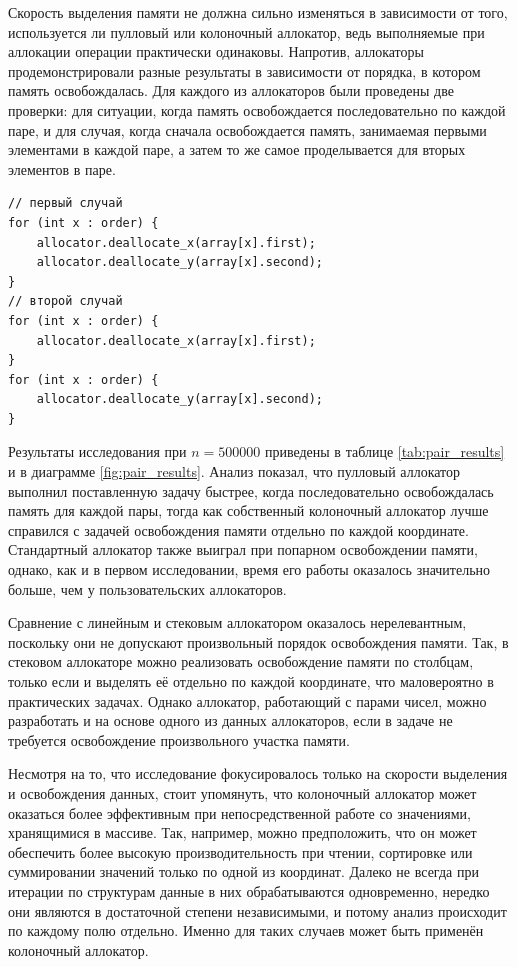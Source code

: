 Скорость выделения памяти не должна сильно изменяться в зависимости от того, используется ли пулловый или колоночный аллокатор, ведь выполняемые при аллокации операции практически одинаковы. Напротив, аллокаторы продемонстрировали разные результаты в зависимости от порядка, в котором память освобождалась. Для каждого из аллокаторов были проведены две проверки: для ситуации, когда память освобождается последовательно по каждой паре, и для случая, когда сначала освобождается память, занимаемая первыми элементами в каждой паре, а затем то же самое проделывается для вторых элементов в паре.

\small
\begin{verbatim}
// первый случай
for (int x : order) {
	allocator.deallocate_x(array[x].first);
	allocator.deallocate_y(array[x].second);
}
// второй случай
for (int x : order) {
	allocator.deallocate_x(array[x].first);
}
for (int x : order) {
	allocator.deallocate_y(array[x].second);
}
\end{verbatim}
\normalsize

Результаты исследования при $n = 500000$ приведены в таблице \ref{tab:pair_results} и в диаграмме \ref{fig:pair_results}. Анализ показал, что пулловый аллокатор выполнил поставленную задачу быстрее, когда последовательно освобождалась память для каждой пары, тогда как собственный колоночный аллокатор лучше справился с задачей освобождения памяти отдельно по каждой координате. Стандартный аллокатор также выиграл при попарном освобождении памяти, однако, как и в первом исследовании, время его работы оказалось значительно больше, чем у пользовательских аллокаторов.

Сравнение с линейным и стековым аллокатором оказалось нерелевантным, поскольку они не допускают произвольный порядок освобождения памяти. Так, в стековом аллокаторе можно реализовать освобождение памяти по столбцам, только если и выделять её отдельно по каждой координате, что маловероятно в практических задачах. Однако аллокатор, работающий с парами чисел, можно разработать и на основе одного из данных аллокаторов, если в задаче не требуется освобождение произвольного участка памяти.

\small

\normalsize


Несмотря на то, что исследование фокусировалось только на скорости выделения и освобождения данных, стоит упомянуть, что колоночный аллокатор может оказаться более эффективным при непосредственной работе со значениями, хранящимися в массиве. Так, например, можно предположить, что он может обеспечить более высокую производительность при чтении, сортировке или суммировании значений только по одной из координат. Далеко не всегда при итерации по структурам данные в них обрабатываются одновременно, нередко они являются в достаточной степени независимыми, и потому анализ происходит по каждому полю отдельно. Именно для таких случаев может быть применён колоночный аллокатор.
